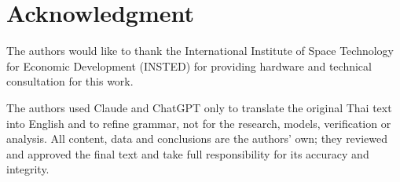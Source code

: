 \documentclass[conference,a4paper]{IEEEtran}
\newif\ifanon
\newif\ifcontrib
\begin{document}
\section*{Acknowledgment}
\ifanon
The authors thank the institute that provided hardware and technical consultation for this work; its name is withheld for double-anonymous review.
\else
The authors would like to thank the International Institute of Space Technology for Economic Development (INSTED) for providing hardware and technical consultation for this work.
\fi
The authors used Claude and ChatGPT only to translate the original Thai text into English and to refine grammar, not for the research, models, verification or analysis. All content, data and conclusions are the authors' own; they reviewed and approved the final text and take full responsibility for its accuracy and integrity.
\ifcontrib
\textit{Author contributions:} B.~Dendumrongkul developed the UPPAAL models, specified the properties and ran the verification; N.~Hirunsirikul led the HIL fault-injection campaign and trace analysis; T.~Sriwaranon and P.~Wanitchollakit contributed to the STM32 firmware and its tests; P.~Saisutjarit provided aerospace-engineering guidance and CubeSat system context; P.~Kanongchaiyos supervised the research and directed the model-checking methodology. \textit{Funding:} the work received no external funding. The authors declare no conflicts of interest.
\fi

\balance


\end{document}

